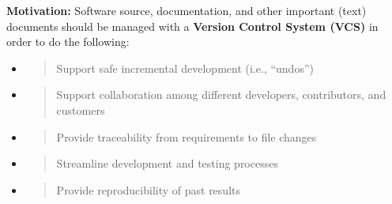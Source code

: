 \documentclass[]{article}
\date{}
\begin{document}
\pagestyle{fancy}
\renewcommand{\headrulewidth}{0pt}
  
\thispagestyle{empty}
\textbf{\newline}


\textbf{Motivation:} Software source, documentation, and other important
(text) documents should be managed with a \textbf{Version Control System
(VCS)} in order to do the following:

\begin{itemize}
\item
  \begin{quote}
  Support safe incremental development (i.e., ``undos'')
  \end{quote}
\item
  \begin{quote}
  Support collaboration among different developers, contributors, and
  customers
  \end{quote}
\item
  \begin{quote}
  Provide traceability from requirements to file changes
  \end{quote}
\item
  \begin{quote}
  Streamline development and testing processes
  \end{quote}
\item
  \begin{quote}
  Provide reproducibility of past results
  \end{quote}
\end{itemize}
\end{document}
